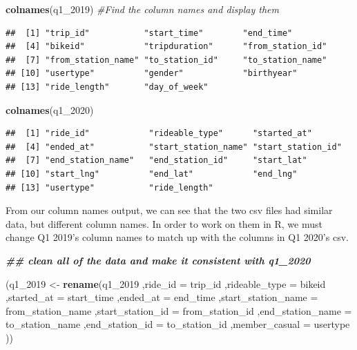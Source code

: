 \documentclass[
]{article}
\newenvironment{Shaded}{\begin{snugshade}}{\end{snugshade}}
\newcommand{\AttributeTok}[1]{\textcolor[rgb]{0.13,0.29,0.53}{#1}}
\newcommand{\CommentTok}[1]{\textcolor[rgb]{0.56,0.35,0.01}{\textit{#1}}}
\newcommand{\DocumentationTok}[1]{\textcolor[rgb]{0.56,0.35,0.01}{\textbf{\textit{#1}}}}
\newcommand{\FunctionTok}[1]{\textcolor[rgb]{0.13,0.29,0.53}{\textbf{#1}}}
\newcommand{\NormalTok}[1]{#1}
\newcommand{\OtherTok}[1]{\textcolor[rgb]{0.56,0.35,0.01}{#1}}
\begin{document}
\begin{Shaded}
\begin{Highlighting}[]
\FunctionTok{colnames}\NormalTok{(q1\_2019) }\CommentTok{\#Find the column names and display them}
\end{Highlighting}
\end{Shaded}

\begin{verbatim}
##  [1] "trip_id"           "start_time"        "end_time"         
##  [4] "bikeid"            "tripduration"      "from_station_id"  
##  [7] "from_station_name" "to_station_id"     "to_station_name"  
## [10] "usertype"          "gender"            "birthyear"        
## [13] "ride_length"       "day_of_week"
\end{verbatim}

\begin{Shaded}
\begin{Highlighting}[]
\FunctionTok{colnames}\NormalTok{(q1\_2020)}
\end{Highlighting}
\end{Shaded}

\begin{verbatim}
##  [1] "ride_id"            "rideable_type"      "started_at"        
##  [4] "ended_at"           "start_station_name" "start_station_id"  
##  [7] "end_station_name"   "end_station_id"     "start_lat"         
## [10] "start_lng"          "end_lat"            "end_lng"           
## [13] "usertype"           "ride_length"
\end{verbatim}

From our column names output, we can see that the two csv files had
similar data, but different column names. In order to work on them in R,
we must change Q1 2019's column names to match up with the columns in Q1
2020's csv.

\begin{Shaded}
\begin{Highlighting}[]
\DocumentationTok{\#\# clean all of the data and make it consistent with q1\_2020}

\NormalTok{(q1\_2019 }\OtherTok{\textless{}{-}} \FunctionTok{rename}\NormalTok{(q1\_2019}
\NormalTok{                   ,}\AttributeTok{ride\_id =}\NormalTok{ trip\_id}
\NormalTok{                   ,}\AttributeTok{rideable\_type =}\NormalTok{ bikeid}
\NormalTok{                   ,}\AttributeTok{started\_at =}\NormalTok{ start\_time}
\NormalTok{                   ,}\AttributeTok{ended\_at =}\NormalTok{ end\_time}
\NormalTok{                   ,}\AttributeTok{start\_station\_name =}\NormalTok{ from\_station\_name}
\NormalTok{                   ,}\AttributeTok{start\_station\_id =}\NormalTok{ from\_station\_id}
\NormalTok{                   ,}\AttributeTok{end\_station\_name =}\NormalTok{ to\_station\_name}
\NormalTok{                   ,}\AttributeTok{end\_station\_id =}\NormalTok{ to\_station\_id}
\NormalTok{                   ,}\AttributeTok{member\_casual =}\NormalTok{ usertype}
\NormalTok{))}
\end{Highlighting}
\end{Shaded}
\end{document}
